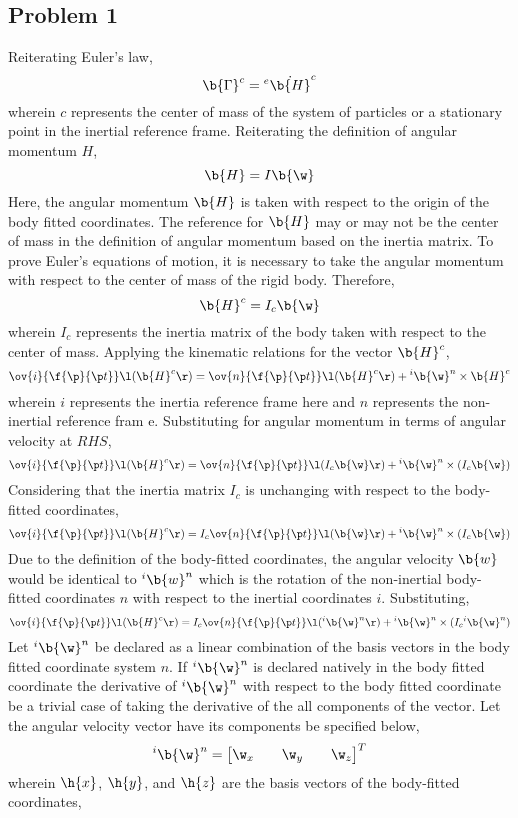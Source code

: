 \documentclass[a4paper, 12pt]{report}
\begin{document}
\begin{center}
\section{Problem 1}
\begin{comment}
\end{comment}

Reiterating Euler's law,
$$\b{\Gamma}^{c} = {}^{e}\dot{\b{H}}^{c}$$
wherein $c$ represents the center of mass of the system of particles or a stationary point in the inertial reference frame. Reiterating the definition of angular momentum $H$,
$$\b{H} = I \b{\w}$$
Here, the angular momentum $\b{H}$ is taken with respect to the origin of the body fitted coordinates. The reference for $\b{H}$ may or may not be the center of mass in the definition of angular momentum based on the inertia matrix. To prove Euler's equations of motion, it is necessary to take the angular momentum with respect to the center of mass of the rigid body. Therefore,
$$\b{H}^{c} = I_c \b{\w}$$
wherein $I_c$ represents the inertia matrix of the body taken with respect to the center of mass. Applying
 the kinematic relations for the vector $\b{H}^c$,
$$\ov{i}{\f{\p}{\p t}}\l(\b{H}^c\r) = \ov{n}{\f{\p}{\p t}}\l(\b{H}^c\r) + {}^i\b{\w}^n\times\b{H}^{c}$$
wherein $i$ represents the inertia reference frame here and $n$ represents the non-inertial reference fram
e. Substituting for angular momentum in terms of angular velocity at $RHS$,
$$\ov{i}{\f{\p}{\p t}}\l(\b{H}^c\r) = \ov{n}{\f{\p}{\p t}}\l(I_c \b{\w}\r) + {}^i\b{\w}^n\times (I_c \b{\w})$$
Considering that the inertia matrix $I_c$ is unchanging with respect to the body-fitted coordinates,
$$\ov{i}{\f{\p}{\p t}}\l(\b{H}^c\r) = I_c\ov{n}{\f{\p}{\p t}}\l(\b{\w}\r) + {}^i\b{\w}^n\times (I_c \b{\w})$$
Due to the definition of the body-fitted coordinates, the angular velocity $\b{w}$ would be identical to $
{}^i\b{w}^n$ which is the rotation of the non-inertial body-fitted coordinates $n$ with respect to the inertial coordinates $i$. Substituting,
$$\ov{i}{\f{\p}{\p t}}\l(\b{H}^c\r) = I_c\ov{n}{\f{\p}{\p t}}\l({}^i\b{\w}^n\r) + {}^i\b{\w}^n\times (I_c {}^i\b{\w}^n)$$
Let ${}^i\b{\w}^n$ be declared as a linear combination of the basis vectors in the body fitted coordinate
system $n$. If ${}^i\b{\w}^n$ is declared natively in the body fitted coordinate the derivative of ${}^i\b{\w}^n$ with respect to the body fitted coordinate be a trivial case of taking the derivative of the all components of the vector.  Let the angular velocity vector have its components be specified below,
$${}^i\b{\w}^n = \begin{bmatrix}\w_x && \w_y && \w_z\end{bmatrix}^T$$
wherein $\h{x}$, $\h{y}$, and $\h{z}$ are the basis vectors of the body-fitted coordinates,


\end{center}
\end{document}
